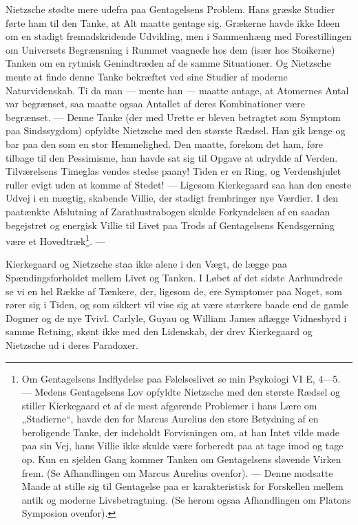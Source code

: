 \documentclass[12pt,a4paper,openany]{book}
\newcommand{\opage}[1]{\marginnote{\footnotesize\textit{[#1]}}}
\begin{document}
Nietzsche stødte mere udefra paa Gentagelsens Problem.
Hans græske Studier førte ham til den Tanke, at Alt maatte
\setcounter{footnote}{0}%
\opage{194}gentage sig. Grækerne havde ikke Ideen om en stadigt fremadskridende
Udvikling, men i Sammenhæng med Forestillingen
om Universets Begrænsning i Rummet vaagnede hos dem (især
hos Stoikerne) Tanken om en rytmisk Genindtræden af de
samme Situationer. Og Nietzsche mente at finde denne Tanke
bekræftet ved sine Studier af moderne Naturvidenskab. Ti da
man --- mente han --- maatte antage, at Atomernes Antal var
begrænset, saa maatte ogsaa Antallet af deres Kombinationer
være begrænset. --- Denne Tanke (der med Urette er bleven
betragtet som Symptom paa Sindssygdom) opfyldte Nietzsche
med den største Rædsel. Han gik længe og bar paa den som
en stor Hemmelighed. Den maatte, forekom det ham, føre
tilbage til den Pessimisme, han havde sat sig til Opgave at
udrydde af Verden. Tilværelsens Timeglas vendes stedse
paany! Tiden er en Ring, og Verdenshjulet ruller evigt uden
at komme af Stedet! --- Ligesom Kierkegaard saa han den
eneste Udvej i en mægtig, skabende Villie, der stadigt frembringer
nye Værdier. I den paatænkte Afslutning af Zarathustrabogen
skulde Forkyndelsen af en saadan begejstret og energisk
Villie til Livet paa Trods af Gentagelsens Kendsgerning være
et Hovedtræk\footnote[1]{Om Gentagelsens Indflydelse paa Følelseslivet se min Psykologi VI E, 4---5. --- Medens Gentagelsens Lov opfyldte Nietzsche med den største Rædsel og stiller Kierkegaard et af de mest afgørende Problemer i hans Lære om „Stadierne“, havde den for Marcus Aurelius den store Betydning af en beroligende Tanke, der indeholdt Forvisningen om, at han Intet vilde møde paa sin Vej, hans Villie ikke skulde være forberedt paa at tage imod og tage op. Kun en sjelden Gang kommer Tanken om Gentagelsens sløvende Virken frem. (Se Afhandlingen om Marcus Aurelius ovenfor). --- Denne modsatte Maade at stille sig til Gentagelse paa er karakteristisk for Forskellen mellem antik og moderne Livsbetragtning. (Se herom ogsaa Afhandlingen om Platons Symposion ovenfor).}. ---

Kierkegaard og Nietzsche staa ikke alene i den Vægt, de
lægge paa Spændingsforholdet mellem Livet og Tanken. I
Løbet af det sidste Aarhundrede se vi en hel Række af Tænkere,
der, ligesom de, ere Symptomer paa Noget, som rører sig i
Tiden, og som sikkert vil vise sig at være stærkere baade end
\setcounter{footnote}{0}%
\opage{195}de gamle Dogmer og de nye Tvivl. Carlyle, Guyau og William
James aflægge Vidnesbyrd i samme Retning, skønt ikke med
den Lidenskab, der drev Kierkegaard og Nietzsche ud i deres
Paradoxer.
\end{document}
